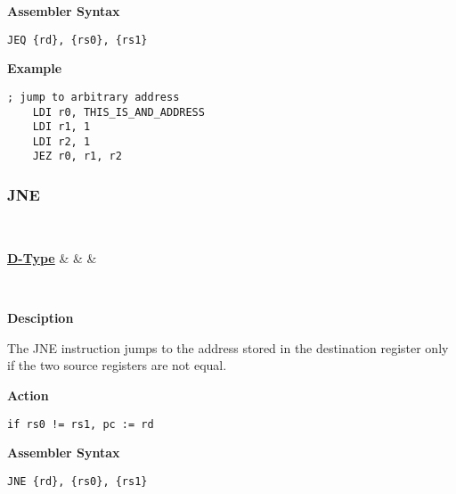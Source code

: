 \vspace{3ex}

\textbf{Assembler Syntax}
\begin{lstlisting}[frame=single]
	JEQ {rd}, {rs0}, {rs1}
\end{lstlisting}

\vspace{3ex}

\textbf{Example}
\begin{lstlisting}[frame=single]
	; jump to arbitrary address
	LDI r0, THIS_IS_AND_ADDRESS
	LDI r1, 1
	LDI r2, 1
	JEZ r0, r1, r2
\end{lstlisting}

\subsubsection{JNE }\label{sec:JNE}

\vspace{3ex}

\begin{center}
	\begin{bytefield}[leftcurly=., leftcurlyspace=0pt]{32}
		 \\
		\begin{leftwordgroup}{\hyperref[sec:r-type]{\textbf{D-Type}}}
		 & 
		 &
		 &
		\end{leftwordgroup}\\
	\end{bytefield}
\end{center}

\textbf{Desciption}

The JNE instruction jumps to the address stored in the destination register only if the two source registers are not equal.

\vspace{3ex}

\textbf{Action}
\begin{lstlisting}[frame=single]
	if rs0 != rs1, pc := rd
\end{lstlisting}

\vspace{3ex}

\textbf{Assembler Syntax}
\begin{lstlisting}[frame=single]
	JNE {rd}, {rs0}, {rs1}
\end{lstlisting}

